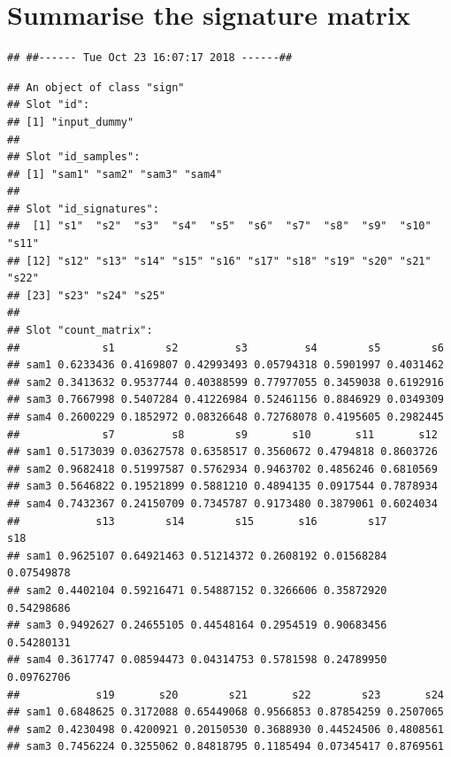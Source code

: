\documentclass{article}
\begin{document}
\section{Summarise the signature matrix}
\begin{knitrout}
\color{fgcolor}\begin{kframe}
\begin{alltt}
\hlstd{()}
\end{alltt}
\begin{verbatim}
## ##------ Tue Oct 23 16:07:17 2018 ------##
\end{verbatim}
\begin{alltt}
\end{alltt}
\begin{verbatim}
## An object of class "sign"
## Slot "id":
## [1] "input_dummy"
## 
## Slot "id_samples":
## [1] "sam1" "sam2" "sam3" "sam4"
## 
## Slot "id_signatures":
##  [1] "s1"  "s2"  "s3"  "s4"  "s5"  "s6"  "s7"  "s8"  "s9"  "s10" "s11"
## [12] "s12" "s13" "s14" "s15" "s16" "s17" "s18" "s19" "s20" "s21" "s22"
## [23] "s23" "s24" "s25"
## 
## Slot "count_matrix":
##             s1        s2         s3         s4        s5        s6
## sam1 0.6233436 0.4169807 0.42993493 0.05794318 0.5901997 0.4031462
## sam2 0.3413632 0.9537744 0.40388599 0.77977055 0.3459038 0.6192916
## sam3 0.7667998 0.5407284 0.41226984 0.52461156 0.8846929 0.0349309
## sam4 0.2600229 0.1852972 0.08326648 0.72768078 0.4195605 0.2982445
##             s7         s8        s9       s10       s11       s12
## sam1 0.5173039 0.03627578 0.6358517 0.3560672 0.4794818 0.8603726
## sam2 0.9682418 0.51997587 0.5762934 0.9463702 0.4856246 0.6810569
## sam3 0.5646822 0.19521899 0.5881210 0.4894135 0.0917544 0.7878934
## sam4 0.7432367 0.24150709 0.7345787 0.9173480 0.3879061 0.6024034
##            s13        s14        s15       s16        s17        s18
## sam1 0.9625107 0.64921463 0.51214372 0.2608192 0.01568284 0.07549878
## sam2 0.4402104 0.59216471 0.54887152 0.3266606 0.35872920 0.54298686
## sam3 0.9492627 0.24655105 0.44548164 0.2954519 0.90683456 0.54280131
## sam4 0.3617747 0.08594473 0.04314753 0.5781598 0.24789950 0.09762706
##            s19       s20        s21       s22        s23       s24
## sam1 0.6848625 0.3172088 0.65449068 0.9566853 0.87854259 0.2507065
## sam2 0.4230498 0.4200921 0.20150530 0.3688930 0.44524506 0.4808561
## sam3 0.7456224 0.3255062 0.84818795 0.1185494 0.07345417 0.8769561

\end{verbatim}
\end{kframe}
\end{knitrout}
\end{document}
